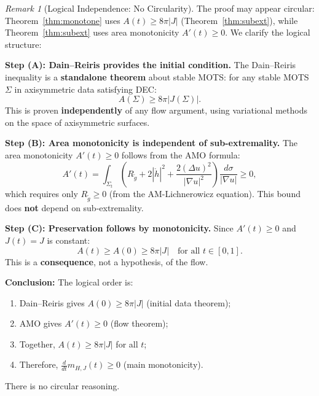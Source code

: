 \documentclass[12pt]{article}
\theoremstyle{plain}
\theoremstyle{definition}
\theoremstyle{remark}
\newtheorem{remark}[theorem]{Remark}
\newcommand{\tg}{\tilde{g}}
\begin{document}
\begin{remark}[Logical Independence: No Circularity]\label{rem:no-circularity}
The proof may appear circular: Theorem~\ref{thm:monotone} uses $A(t) \geq 8\pi|J|$ (Theorem~\ref{thm:subext}), while Theorem~\ref{thm:subext} uses area monotonicity $A'(t) \geq 0$. We clarify the logical structure:

\textbf{Step (A): Dain--Reiris provides the initial condition.}
The Dain--Reiris inequality \cite{dain2011} is a \textbf{standalone theorem} about stable MOTS: for any stable MOTS $\Sigma$ in axisymmetric data satisfying DEC:
\[
A(\Sigma) \geq 8\pi|J(\Sigma)|.
\]
This is proven \textbf{independently} of any flow argument, using variational methods on the space of axisymmetric surfaces.

\textbf{Step (B): Area monotonicity is independent of sub-extremality.}
The area monotonicity $A'(t) \geq 0$ follows from the AMO formula:
\[
A'(t) = \int_{\Sigma_t} \left(R_{\tg} + 2|\mathring{h}|^2 + \frac{2(\Delta u)^2}{|\nabla u|^2}\right) \frac{d\sigma}{|\nabla u|} \geq 0,
\]
which requires only $R_{\tg} \geq 0$ (from the AM-Lichnerowicz equation). This bound does \textbf{not} depend on sub-extremality.

\textbf{Step (C): Preservation follows by monotonicity.}
Since $A'(t) \geq 0$ and $J(t) = J$ is constant:
\[
A(t) \geq A(0) \geq 8\pi|J| \quad \text{for all } t \in [0, 1].
\]
This is a \textbf{consequence}, not a hypothesis, of the flow.

\textbf{Conclusion:} The logical order is:
\begin{enumerate}
    \item Dain--Reiris gives $A(0) \geq 8\pi|J|$ (initial data theorem);
    \item AMO gives $A'(t) \geq 0$ (flow theorem);
    \item Together, $A(t) \geq 8\pi|J|$ for all $t$;
    \item Therefore, $\frac{d}{dt} m_{H,J}(t) \geq 0$ (main monotonicity).
\end{enumerate}
There is no circular reasoning.
\end{remark}
\end{document}
